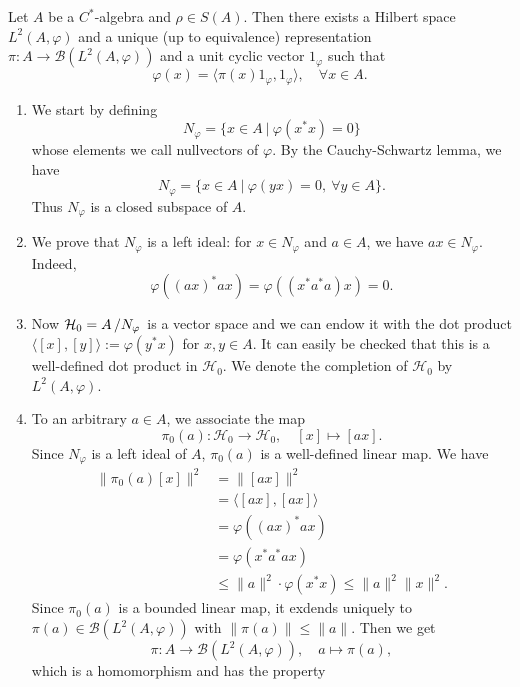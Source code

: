 \begin{theorem}
  Let $A$ be a $C^*$-algebra and $\rho \in S(A)$.
  Then there exists a Hilbert space $L^2 (A, \varphi)$ and a unique (up to equivalence)
  representation $\pi : A \to \mathcal{B} (L^2 (A, \varphi))$ and a unit cyclic vector $1_{\varphi}$
  such that $$\varphi(x) = \langle \pi(x) 1_{\varphi} , 1_{\varphi} \rangle,\quad \forall x \in A.$$
\end{theorem}

\begin{myproof}
  \begin{enumerate}
    \item We start by defining $$N_\varphi = \{x \in A\ |\ \varphi(x^* x) = 0\}$$
    whose elements we call nullvectors of $\varphi$. By the Cauchy-Schwartz lemma, we have 
    $$N_\varphi = \{x \in A\ |\ \varphi(yx) = 0,\ \forall y \in A\}.$$
    Thus $N_\varphi$ is a closed subspace of $A$.
    \item We prove that $N_\varphi$ is a left ideal: for $x \in N_\varphi$ and $a \in A$, we have $ax \in N_\varphi$.
    Indeed, 
    $$\varphi ((ax)^* ax) = \varphi ((x^* a^* a) x) = 0.$$
    \item Now $\mathcal{H}_0 = \quot{A}{N_\varphi}$ is a vector space and we can endow it with the dot product 
    $\langle [x], [y] \rangle := \varphi(y^* x)$ for $x, y \in A$. It can easily be checked that this is a well-defined dot product in $\mathcal{H}_0$.
    We denote the completion of $\mathcal{H}_0$  by $L^2 (A, \varphi)$.
    \item To an arbitrary $a \in A$, we associate the map 
    $$\pi_0 (a) : \mathcal{H}_0 \to \mathcal{H}_0,\quad [x] \mapsto [ax].$$
    Since $N_\varphi$ is a left ideal of $A$, $\pi_0 (a)$ is a well-defined linear map. We have
    \begin{align*}
      \| \pi_0 (a) [x]\|^2 &= \| [ax]\|^2\\
      &= \langle [ax], [ax]\rangle\\
      &= \varphi ((ax)^* ax)\\
      &= \varphi(x^* a^* a x)\\
      &\leq \| a\|^2 \cdot \varphi(x^* x) \leq \| a\|^2 \|x\|^2.
    \end{align*}
    Since $\pi_0 (a)$ is a bounded linear map, it exdends uniquely to $\pi (a) \in \mathcal{B}(L^2 (A, \varphi))$
    with $\| \pi(a)\| \leq \| a\|$. Then we get $$\pi: A \to \mathcal{B} (L^2 (A, \varphi)),\quad a \mapsto \pi(a),$$
    which is a homomorphism and has the property 

\end{enumerate}
\end{myproof}

